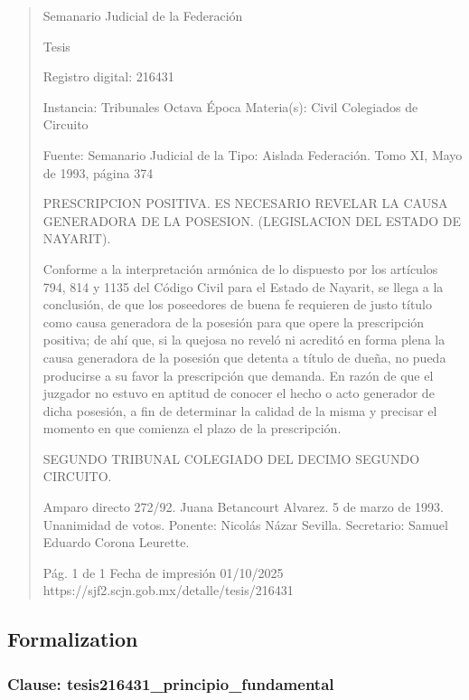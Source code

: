 \documentclass[11pt,a4paper]{article}
\begin{document}
\begin{quote}
                                                   Semanario Judicial de la Federación

                                                  Tesis

 Registro digital: 216431

 Instancia: Tribunales            Octava Época                       Materia(s): Civil
 Colegiados de Circuito

                                  Fuente: Semanario Judicial de la  Tipo: Aislada
                                  Federación.
                                  Tomo XI, Mayo de 1993, página 374


PRESCRIPCION POSITIVA. ES NECESARIO REVELAR LA CAUSA GENERADORA DE LA
POSESION. (LEGISLACION DEL ESTADO DE NAYARIT).


Conforme a la interpretación armónica de lo dispuesto por los artículos 794, 814 y 1135 del Código
Civil para el Estado de Nayarit, se llega a la conclusión, de que los poseedores de buena fe
requieren de justo título como causa generadora de la posesión para que opere la prescripción
positiva; de ahí que, si la quejosa no reveló ni acreditó en forma plena la causa generadora de la
posesión que detenta a título de dueña, no pueda producirse a su favor la prescripción que
demanda. En razón de que el juzgador no estuvo en aptitud de conocer el hecho o acto generador
de dicha posesión, a fin de determinar la calidad de la misma y precisar el momento en que
comienza el plazo de la prescripción.

SEGUNDO TRIBUNAL COLEGIADO DEL DECIMO SEGUNDO CIRCUITO.


Amparo directo 272/92. Juana Betancourt Alvarez. 5 de marzo de 1993. Unanimidad de votos.
Ponente: Nicolás Názar Sevilla. Secretario: Samuel Eduardo Corona Leurette.




                                             Pág. 1 de 1          Fecha de impresión 01/10/2025
  https://sjf2.scjn.gob.mx/detalle/tesis/216431

\end{quote}

\subsection{Formalization}

\subsubsection{Clause: tesis216431\_principio\_fundamental}
\end{document}
